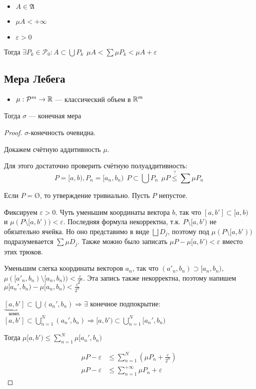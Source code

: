 \begin{corollary}\itemfix
    \begin{itemize}
        \item \(A\in \mathfrak{A}\)
        \item \(\mu A < +\infty\)
        \item \(\varepsilon > 0\)
    \end{itemize}
    Тогда \(\exists P_k \in \mathcal{P}_0 : A\subset \bigcup P_k \ \ \mu A < \sum \mu P_k < \mu A + \varepsilon\)
\end{corollary}

\subsection*{Мера Лебега}

\begin{theorem}\itemfix
    \begin{itemize}
        \item \(\mu : \mathcal{P}^m \to \mathbb{R}\) --- классический объем в \(\mathbb{R}^m\)
    \end{itemize}
    Тогда \(\sigma\) --- конечная мера
\end{theorem}
\begin{proof}
    \(\sigma\)-конечность очевидна.

    Докажем счётную аддитивность \(\mu\).

    Для этого достаточно проверить счётную полуаддитивность:
    \[P = [a, b), P_n = [a_n, b_n) \ \ P\subset \bigcup P_n \ \ \mu P \stackrel{?}{\le} \sum \mu P_n\]

    Если \(P = \text{\O}\), то утверждение тривиально. Пусть \(P\) непустое.

    Фиксируем \(\varepsilon > 0\). Чуть уменьшим координаты вектора \(b\), так что \([a, b'] \subset [a, b)\) и \(\mu(P\setminus [a, b')) < \varepsilon\). Последняя формула некорректна, т.к. \(P\setminus [a, b')\) не обязательно ячейка. Но оно представимо в виде \(\bigsqcup D_j\), поэтому под \(\mu(P\setminus [a, b'))\) подразумевается \(\sum \mu D_j\). Также можно было записать \(\mu P - \mu[a, b') < \varepsilon\) вместо этих трюков.

    Уменьшим слегка координаты векторов \(a_n\), так что \((a'_n, b_n) \supset [a_n, b_n)\), \(\mu([a'_n, b_n) \setminus [a_n, b_n)) < \frac{\varepsilon}{2^n}\). Эта запись также некорректна, поэтому напишем \(\mu[a_n', b_n) - \mu[a_n, b_n) < \frac{\varepsilon}{2^n}\)

    \(\underbrace{[a, b']}_{\text{комп.}} \subset \bigcup (a_n', b_n) \Rightarrow \exists \) конечное подпокрытие: \([a, b'] \subset \bigcup\limits_{n = 1}^N (a_n', b_n) \Rightarrow [a, b') \subset \bigcup\limits_{n = 1}^{N} [a_n', b_n)\)

    Тогда \(\mu[a, b') \le \sum\limits_{n = 1}^{N} \mu[a_n', b_n)\)

    \begin{align}
        \mu P - \varepsilon & \leq \sum_{n = 1}^N \left( \mu P_n + \frac{\varepsilon}{2^n} \right) \\
        \mu P - \varepsilon & \leq \sum_{n = 1}^{ +\infty} \mu P_n + \varepsilon
    \end{align}
\end{proof}

